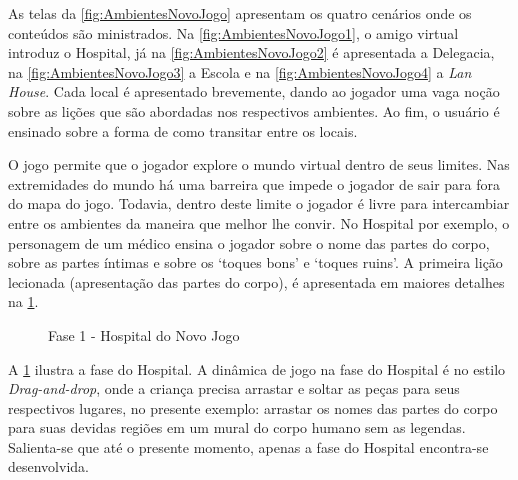 \documentclass[alpha-refs,brazilian]{RBCA_v2.0}
\begin{document}
As telas da \cref{fig:AmbientesNovoJogo} apresentam os quatro cenários onde os conteúdos são ministrados. Na \cref{fig:AmbientesNovoJogo1}, o amigo virtual introduz o Hospital, já na \cref{fig:AmbientesNovoJogo2} é apresentada a Delegacia, na \cref{fig:AmbientesNovoJogo3} a Escola e na \cref{fig:AmbientesNovoJogo4} a \textit{Lan House}. Cada local é apresentado brevemente, dando ao jogador uma vaga noção sobre as lições que são abordadas nos respectivos ambientes. Ao fim, o usuário é ensinado sobre a forma de como transitar entre os locais.

O jogo permite que o jogador explore o mundo virtual dentro de seus limites. Nas extremidades do mundo há uma barreira que impede o jogador de sair para fora do mapa do jogo. Todavia, dentro deste limite o jogador é livre para intercambiar entre os ambientes da maneira que melhor lhe convir. No Hospital por exemplo, o personagem de um médico ensina o jogador sobre o nome das partes do corpo, sobre as partes íntimas e sobre os `toques bons' e `toques ruins'. A primeira lição lecionada (apresentação das partes do corpo), é apresentada em maiores detalhes na \cref{fig:Hospital}.

\vspace{- 0.3 cm}

 \begin{figure}[h]
  \centering
  \caption{Fase 1 - Hospital do Novo Jogo}
  \label{fig:Hospital}
\end{figure} 

\vspace{- 0.4 cm}

A \cref{fig:Hospital} ilustra a fase do Hospital. A dinâmica de jogo na fase do Hospital é no estilo \textit{Drag-and-drop}, onde a criança precisa arrastar e soltar as peças para seus respectivos lugares, no presente exemplo: arrastar os nomes das partes do corpo para suas devidas regiões em um mural do corpo humano sem as legendas. Salienta-se que até o presente momento, apenas a fase do Hospital encontra-se desenvolvida.
\end{document}
